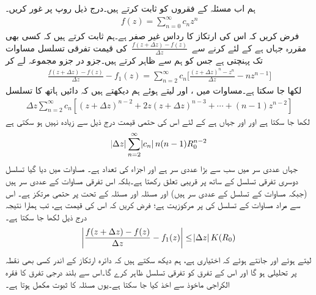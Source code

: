 ہم اب مسئلہ  کے فقروں کو ثابت کرتے ہیں۔درج ذیل روپ پر غور کریں۔
\begin{align*}
f(z)=\sum\limits_{n=0}^{\infty} c_n z^n
\end{align*}
فرض کریں کہ اس کی  ارتکاز کا رداس  غیر صفر ہے۔ہم ثابت کرتے ہیں کہ کسی بھی مقررہ  جہاں  ہے کے لئے  کرنے سے 
$\,\tfrac{f(z+\Delta z)-f(z)}{\Delta z}\,$
 کی قیمت تفرقی تسلسل مساوات  تک پہنچتی ہے جس کو ہم  سے ظاہر کرتے ہیں۔جزو در جزو مجموعہ لے کر
\begin{align*}
\frac{f(z+\Delta z)-f(z)}{\Delta z}-f_1(z)=\sum\limits_{n=2}^{\infty} c_n\big[\frac{(z+\Delta z)^n-z^n}{\Delta z}-nz^{n-1}\big]
\end{align*}
لکھا جا سکتا ہے۔مساوات  میں ،  اور  لیتے ہوئے ہم دیکھتے ہیں کہ دائیں ہاتھ کا تسلسل
\begin{align*}
\Delta z\sum\limits_{n=2}^{\infty} c_n[(z+\Delta z)^{n-2}+2z(z+\Delta z)^{n-3}+\cdots+(n-1)z^{n-2}]
\end{align*} 
لکھا جا سکتا ہے اور  اور  جہاں  ہے کے لئے اس کی حتمی قیمت درج ذیل سے زیادہ نہیں ہو سکتی ہے
\begin{align}\label{مساوات_ٹیلر_دوسری_تفرقی_تسلسل}
\abs{\Delta z}\sum\limits_{n=2}^{\infty} \abs{c_n} n(n-1)R_0^{n-2}
\end{align}
جہاں عددی سر  میں سب سے بڑا عددی سر  ہے اور  اجزاء کی تعداد  ہے۔ مساوات  میں دیا گیا تسلسل   دوسری تفرقی تسلسل کے ساتھ  پر  قریبی تعلق رکھتا ہے۔بلکہ اس تفرقی مساوات کے عددی سر  ہیں (جبکہ مساوات  کے تسلسل کے عددی سر  ہیں) اور مسئلہ  اور مسئلہ  کے تحت   پر حتمی مرتکز ہے۔ اس سے مراد مساوات  کے تسلسل کی  پر مرکوزیت ہے؛ فرض کریں کہ اس کی قیمت  ہے، تب ہمارا نتیجہ درج  ذیل لکھا جا سکتا ہے۔
\begin{align*}
\abs{\frac{f(z+\Delta z)-f(z)}{\Delta z}-f_1(z)}\le \abs{\Delta z} K(R_0)
\end{align*}
 لیتے ہوئے اور جانتے ہوئے کہ  اختیاری ہے، ہم دیکھ سکتے ہیں کہ دائرہ ارتکاز کے اندر کسی بھی نقطہ پر  تحلیلی ہو گا اور اس کے تفرق کو تفرقی تسلسل ظاہر کرے گا۔اس سے بلند درجی تفرق کا فقرہ الکراجی ماخوذ سے اخذ کیا جا سکتا ہے۔یوں  مسئلہ  کا ثبوت مکمل ہوتا ہے۔


